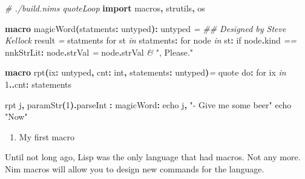 \documentclass[
  12pt,
]{book}
\newenvironment{Shaded}{}{}
\newcommand{\CommentTok}[1]{\textcolor[rgb]{0.38,0.63,0.69}{\textit{#1}}}
\newcommand{\DataTypeTok}[1]{\textcolor[rgb]{0.56,0.13,0.00}{#1}}
\newcommand{\DecValTok}[1]{\textcolor[rgb]{0.25,0.63,0.44}{#1}}
\newcommand{\DocumentationTok}[1]{\textcolor[rgb]{0.73,0.13,0.13}{\textit{#1}}}
\newcommand{\KeywordTok}[1]{\textcolor[rgb]{0.00,0.44,0.13}{\textbf{#1}}}
\newcommand{\NormalTok}[1]{#1}
\newcommand{\OtherTok}[1]{\textcolor[rgb]{0.00,0.44,0.13}{#1}}
\newcommand{\StringTok}[1]{\textcolor[rgb]{0.25,0.44,0.63}{#1}}
\providecommand{\tightlist}{%
  \setlength{\itemsep}{0pt}\setlength{\parskip}{0pt}}
\begin{document}
\begin{Shaded}
\begin{Highlighting}[]
\CommentTok{\# ./build.nims quoteLoop}
\KeywordTok{import}\NormalTok{ macros}\KeywordTok{,}\NormalTok{ strutils}\KeywordTok{,}\NormalTok{ os}

\KeywordTok{macro }\StringTok{magicWord}\KeywordTok{(}\NormalTok{statments}\KeywordTok{:} \DataTypeTok{untyped}\KeywordTok{):} \DataTypeTok{untyped} \CommentTok{=}
    \DocumentationTok{\#\# Designed by Steve Kellock}
    \OtherTok{result} \CommentTok{=}\NormalTok{ statments}
    \DataTypeTok{for}\NormalTok{ st }\CommentTok{in}\NormalTok{ statments}\KeywordTok{:}
          \DataTypeTok{for}\NormalTok{ node }\CommentTok{in}\NormalTok{ st}\KeywordTok{:}
                \DataTypeTok{if}\NormalTok{ node}\KeywordTok{.}\DataTypeTok{kind} \CommentTok{==}\NormalTok{ nnkStrLit}\KeywordTok{:}
\NormalTok{                     node}\KeywordTok{.}\DataTypeTok{strVal} \CommentTok{=}\NormalTok{ node}\KeywordTok{.}\DataTypeTok{strVal} \CommentTok{\&} \StringTok{", Please."}

\KeywordTok{macro }\StringTok{rpt}\KeywordTok{(}\NormalTok{ix}\KeywordTok{:} \DataTypeTok{untyped}\KeywordTok{,}\NormalTok{ cnt}\KeywordTok{:} \DataTypeTok{int}\KeywordTok{,}\NormalTok{ statements}\KeywordTok{:} \DataTypeTok{untyped}\KeywordTok{)}\CommentTok{=}
  \DataTypeTok{quote} \DataTypeTok{do}\KeywordTok{:}
    \DataTypeTok{for}\NormalTok{ \textasciigrave{}ix\textasciigrave{} }\CommentTok{in} \DecValTok{1}\KeywordTok{..}\NormalTok{\textasciigrave{}cnt\textasciigrave{}}\KeywordTok{:}
\NormalTok{      \textasciigrave{}statements\textasciigrave{}}

\DataTypeTok{rpt}\NormalTok{ j}\KeywordTok{,} \DataTypeTok{paramStr}\KeywordTok{(}\DecValTok{1}\KeywordTok{).}\DataTypeTok{parseInt} \KeywordTok{:}
\NormalTok{  magicWord}\KeywordTok{:}
     \DataTypeTok{echo}\NormalTok{ j}\KeywordTok{,} \StringTok{"{-} Give me some beer"}
     \DataTypeTok{echo} \StringTok{"Now"}
\end{Highlighting}
\end{Shaded}

\begin{enumerate}
\def\labelenumi{(\arabic{enumi})}
\setcounter{enumi}{11}
\tightlist
\item
  My first macro
\end{enumerate}

Until not long ago, Lisp was the only language that had macros. Not any
more. Nim macros will allow you to design new commands for the language.
\end{document}
